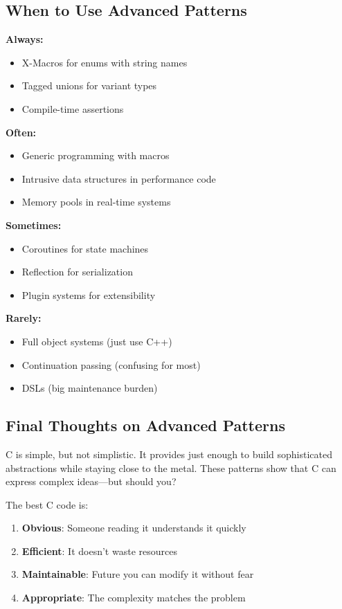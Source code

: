 \subsection{When to Use Advanced Patterns}

\textbf{Always:}
\begin{itemize}
    \item X-Macros for enums with string names
    \item Tagged unions for variant types
    \item Compile-time assertions
\end{itemize}

\textbf{Often:}
\begin{itemize}
    \item Generic programming with macros
    \item Intrusive data structures in performance code
    \item Memory pools in real-time systems
\end{itemize}

\textbf{Sometimes:}
\begin{itemize}
    \item Coroutines for state machines
    \item Reflection for serialization
    \item Plugin systems for extensibility
\end{itemize}

\textbf{Rarely:}
\begin{itemize}
    \item Full object systems (just use C++)
    \item Continuation passing (confusing for most)
    \item DSLs (big maintenance burden)
\end{itemize}

\subsection{Final Thoughts on Advanced Patterns}

C is simple, but not simplistic. It provides just enough to build sophisticated abstractions while staying close to the metal. These patterns show that C can express complex ideas---but should you?

The best C code is:
\begin{enumerate}
    \item \textbf{Obvious}: Someone reading it understands it quickly
    \item \textbf{Efficient}: It doesn't waste resources
    \item \textbf{Maintainable}: Future you can modify it without fear
    \item \textbf{Appropriate}: The complexity matches the problem
\end{enumerate}

